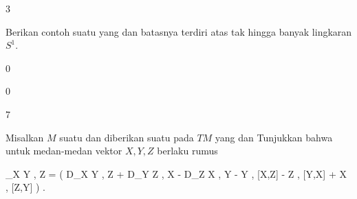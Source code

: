 {3}
{

Berikan contoh suatu
yang
dan batasnya terdiri atas
 {} {}
tak hingga banyak lingkaran $S^1$.

}
{} {}

{0}
{

}
{} {}

{0}
{

}
{} {}

{7}
{

Misalkan $M$ suatu
dan diberikan suatu
pada
$TM$ yang
dan
Tunjukkan bahwa untuk medan-medan vektor $X,Y,Z$ berlaku rumus

\mavergleichskettedisp
{\vergleichskette
{ \left\langle \nabla_X Y , Z  \right\rangle
}
{ =} { {  }  \left(  D_X \left\langle  Y  ,  Z  \right\rangle +  D_Y \left\langle  Z  ,  X  \right\rangle -  D_Z \left\langle  X  ,  Y  \right\rangle  - \left\langle  Y  , [X,Z]   \right\rangle - \left\langle  Z  , [Y,X]   \right\rangle + \left\langle  X  , [Z,Y]   \right\rangle   \right)
}
{ } {
}
{ } {
}
{ } {
}
}
{}{}{.}

}
{} {}
